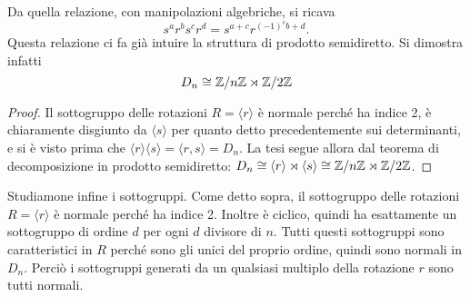     Da quella relazione, con manipolazioni algebriche, si ricava 
    \[ s^ar^bs^cr^d= s^{a+c} r^{(-1)^cb + d}. \]
    Questa relazione ci fa già intuire la struttura di prodotto semidiretto. Si dimostra infatti
    \[ D_n \cong \mathbb{Z}/n\mathbb{Z} \rtimes \mathbb{Z}/2\mathbb{Z} \]
\begin{proof}
    Il sottogruppo delle rotazioni $R=\langle r \rangle$ è normale perché ha indice 2, è chiaramente disgiunto da $\langle s \rangle$ per quanto detto precedentemente sui determinanti, e si è visto prima che $\langle r \rangle \langle s \rangle = \langle r, s \rangle = D_n$. La tesi segue allora dal teorema di decomposizione in prodotto semidiretto: $D_n \cong \langle r \rangle \rtimes \langle s\rangle \cong \mathbb{Z}/n\mathbb{Z} \rtimes \mathbb{Z}/2\mathbb{Z}$.
\end{proof}
Studiamone infine i sottogruppi. Come detto sopra, il sottogruppo delle rotazioni $R = \langle r \rangle$ è normale perché ha indice 2. Inoltre è ciclico, quindi ha esattamente un sottogruppo di ordine $d$ per ogni $d$ divisore di $n$. Tutti questi sottogruppi sono caratteristici in $R$ perché sono gli unici del proprio ordine, quindi sono normali in $D_n$. Perciò i sottogruppi generati da un qualsiasi multiplo della rotazione $r$ sono tutti normali.

